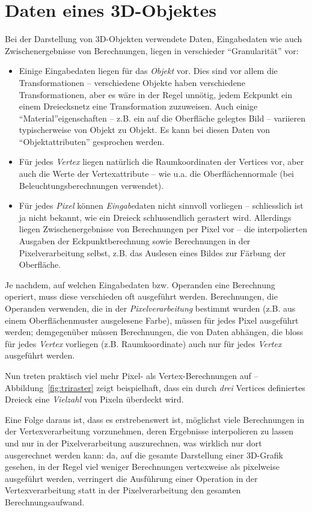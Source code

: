 \documentclass[twoside,a4paper,fleqn,12pt]{book}
\begin{document}
\section{Daten eines 3D-Objektes}
\label{object_data}

Bei der Darstellung von 3D-Objekten verwendete Daten, Eingabedaten wie auch Zwischenergebnisse von Berechnungen,
liegen in verschieder "`Granularität"' vor:

\begin{itemize}
\item Einige Eingabedaten liegen für das \emph{Objekt} vor.
Dies sind vor allem die Transformationen -- verschiedene Objekte haben verschiedene Transformationen,
aber es wäre in der Regel unnötig, jedem Eckpunkt ein einem Dreiecksnetz eine Transformation zuzuweisen.
Auch einige "`Material"'eigenschaften -- z.B. ein auf die Oberfläche gelegtes Bild -- variieren typischerweise von Objekt zu Objekt.
Es kann bei diesen Daten von "`Objektattributen"' gesprochen werden.
\item Für jedes \emph{Vertex} liegen natürlich die Raumkoordinaten der Vertices vor, aber auch 
die Werte der Vertexattribute -- wie u.a. die Oberflächennormale (bei Beleuchtungsberechnungen verwendet).
\item Für jedes \emph{Pixel} können \emph{Eingabe}daten nicht sinnvoll vorliegen -- schliesslich ist ja nicht bekannt, wie ein Dreieck
schlussendlich gerastert wird. Allerdings liegen Zwischenergebnisse von Berechnungen per Pixel vor -- die  interpolierten Ausgaben der
Eckpunktberechnung sowie Berechnungen in der Pixelverarbeitung selbst, z.B. das Auslesen eines Bildes
zur Färbung der Oberfläche.
\end{itemize}

Je nachdem, auf welchen Eingabedaten bzw. Operanden eine Berechnung operiert, muss diese verschieden oft ausgeführt werden.
Berechnungen, die Operanden verwenden, die in der \emph{Pixelverarbeitung} bestimmt wurden (z.B. aus einem Oberflächenmuster ausgelesene Farbe),
müssen für jedes Pixel ausgeführt werden;
demgegenüber müssen Berechnungen, die von Daten abhängen, die bloss für jedes \emph{Vertex} vorliegen (z.B. Raumkoordinate)
auch nur für jedes \emph{Vertex} ausgeführt werden.

Nun treten praktisch viel mehr Pixel- als Vertex-Berechnungen auf -- Abbildung~\ref{fig:triraster} zeigt beispielhaft,
dass ein durch \emph{drei} Vertices definiertes Dreieck eine \emph{Vielzahl} von Pixeln überdeckt wird.

Eine Folge daraus ist, dass es erstrebenswert ist, möglichst viele Berechnungen in der Vertexverarbeitung vorzunehmen, deren Ergebnisse interpolieren zu lassen
und nur in der Pixelverarbeitung auszurechnen, was wirklich nur dort ausgerechnet werden kann: da, auf die gesamte Darstellung einer 3D-Grafik gesehen,
in der Regel viel weniger Berechnungen vertexweise als pixelweise ausgeführt werden, verringert die Ausführung einer Operation in der Vertexverarbeitung statt in der Pixelverarbeitung
den gesamten Berechnungsaufwand.
\end{document}
